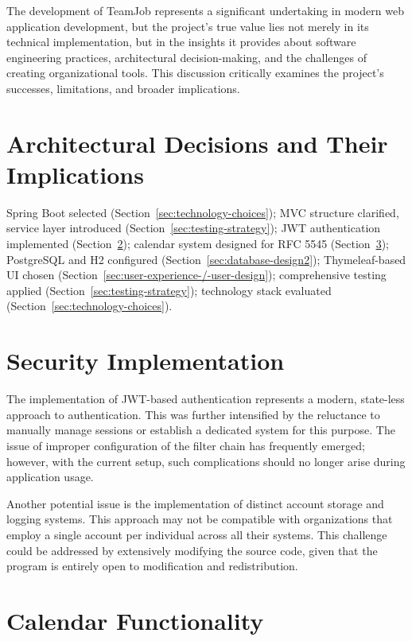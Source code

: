 The development of TeamJob represents a significant undertaking in modern web application development, but the project's true value lies not merely in its technical implementation, but in the insights it provides about software engineering practices, architectural decision-making, and the challenges of creating organizational tools.
This discussion critically examines the project's successes, limitations, and broader implications.


\section{Architectural Decisions and Their Implications}\label{sec:architectural-decisions-and-their-implications}

Spring Boot selected (Section~\ref{sec:technology-choices}); MVC structure clarified, service layer introduced (Section~\ref{sec:testing-strategy}); JWT authentication implemented (Section~\ref{sec:security-implementation}); calendar system designed for RFC 5545 (Section~\ref{sec:calendar-functionality}); PostgreSQL and H2 configured (Section~\ref{sec:database-design2}); Thymeleaf-based UI chosen (Section~\ref{sec:user-experience-/-user-design}); comprehensive testing applied (Section~\ref{sec:testing-strategy}); technology stack evaluated (Section~\ref{sec:technology-choices}).


\section{Security Implementation}\label{sec:security-implementation}

The implementation of JWT-based authentication represents a modern, state-less approach to authentication.
This was further intensified by the reluctance to manually manage sessions or establish a dedicated system for this purpose.
The issue of improper configuration of the filter chain has frequently emerged; however, with the current setup, such complications should no longer arise during application usage.

Another potential issue is the implementation of distinct account storage and logging systems.
This approach may not be compatible with organizations that employ a single account per individual across all their systems.
This challenge could be addressed by extensively modifying the source code, given that the program is entirely open to modification and redistribution.


\section{Calendar Functionality}\label{sec:calendar-functionality}


